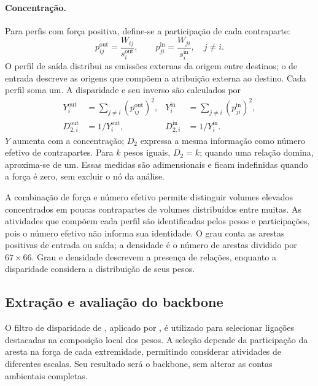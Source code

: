 \paragraph{Concentração.}
Para perfis com força positiva, define-se a participação de cada contraparte:
\begin{equation}
p_{ij}^{\mathrm{out}}=\frac{W_{ij}}{s_i^{\mathrm{out}}},\qquad
p_{ji}^{\mathrm{in}}=\frac{W_{ji}}{s_i^{\mathrm{in}}},\quad j\ne i.
\label{eq:participacoes-externas}
\end{equation}
O perfil de saída distribui as emissões externas da origem entre destinos; o de entrada descreve as origens que compõem a atribuição externa ao destino. Cada perfil soma um. A disparidade e seu inverso são calculados por
\begin{equation}
\begin{aligned}
Y_i^{\mathrm{out}}&=\sum_{j\ne i}(p_{ij}^{\mathrm{out}})^2,&
Y_i^{\mathrm{in}}&=\sum_{j\ne i}(p_{ji}^{\mathrm{in}})^2,\\
D_{2,i}^{\mathrm{out}}&=1/Y_i^{\mathrm{out}},&
D_{2,i}^{\mathrm{in}}&=1/Y_i^{\mathrm{in}}.
\end{aligned}
\label{eq:disparidade}
\end{equation}
$Y$ aumenta com a concentração; $D_2$ expressa a mesma informação como número efetivo de contrapartes. Para $k$ pesos iguais, $D_2=k$; quando uma relação domina, aproxima-se de um. Essas medidas são adimensionais e ficam indefinidas quando a força é zero, sem excluir o nó da análise.

A combinação de força e número efetivo permite distinguir volumes elevados concentrados em poucas contrapartes de volumes distribuídos entre muitas. As atividades que compõem cada perfil são identificadas pelos pesos e participações, pois o número efetivo não informa sua identidade. O grau conta as arestas positivas de entrada ou saída; a densidade é o número de arestas dividido por $67\times66$. Grau e densidade descrevem a presença de relações, enquanto a disparidade considera a distribuição de seus pesos.

\subsection{Extração e avaliação do backbone}
\label{sec:backbone}

O filtro de disparidade de \textcite{serrano2009}, aplicado por \textcite{huang2019}, é utilizado para selecionar ligações destacadas na composição local dos pesos. A seleção depende da participação da aresta na força de cada extremidade, permitindo considerar atividades de diferentes escalas. Seu resultado será o backbone, sem alterar as contas ambientais completas.

